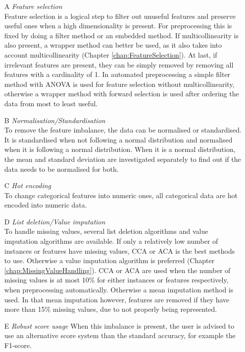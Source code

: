 \documentclass[10pt,a4paper]{report}
\begin{document}
	\begin{enumerate}
		\item[A] \textit{Feature selection} \\
		Feature selection is a logical step to filter out unuseful features and preserve useful ones when a high dimensionality is present. For preprocessing this is fixed by doing a filter method  or an embedded method. If multicollinearity is also present, a wrapper method can better be used, as it also takes into account multicollinearity (Chapter \ref{chap:FeatureSelection}). At last, if irrelevant features are present, they can be simply removed by removing all features with a cardinality of 1. In automated preprocessing a simple filter method with ANOVA is used for feature selection without multicollinearity, otherwise a wrapper method with forward selection is used after ordering the data from most to least useful.
		
		\item[B] \textit{Normalisation/Standardisation} \\
		To remove the feature imbalance, the data can be normalised or standardised. It is standardised when not following a normal distribution and normalised when it is following a normal distribution. When it is a normal distribution, the mean and standard deviation are investigated separately to find out if the data needs to be normalised for both.
		
		\item[C] \textit{Hot encoding} \\
		To change categorical features into numeric ones, all categorical data are hot encoded into numeric data.		
		
		\item[D] \textit{List deletion/Value imputation} \\
		To handle missing values, several list deletion algorithms and value imputation algorithms are available. If only a relatively low number of instances or features have missing values, CCA or ACA is the best methods to use. Otherwise a value imputation algorithm is preferred (Chapter \ref{chap:MissingValueHandling}). CCA or ACA are used when the number of missing values is at most 10\% for either instances or features respectively, when preprocessing automatically. Otherwise a mean imputation method is used. In that mean imputation however, features are removed if they have more than 15\% missing values, due to not properly being represented.
		
		\item[E] \textit{Robust score usage}
		When this imbalance is present, the user is advised to use an alternative score system than the standard accuracy, for example the F1-score.		
		 
	\end{enumerate}
	
\end{document}
